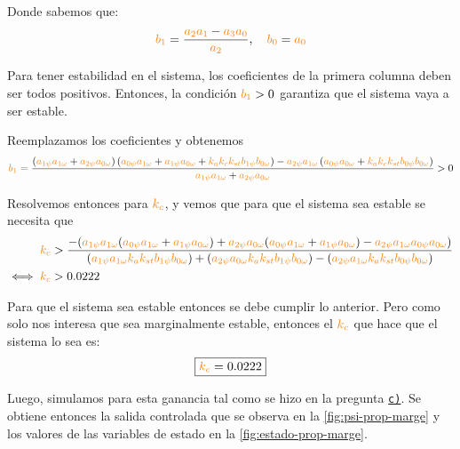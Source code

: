 Donde sabemos que:
\begin{align}
  \nara{b_1} = \frac{\nara{a_2 a_1} - \nara{a_3 a_0}}{\nara{a_2}},\quad
  \nara{b_0} = \nara{a_0}
\end{align}

Para tener estabilidad en el sistema, los coeficientes de la primera columna
deben ser todos positivos. Entonces, la condición $\nara{b_1} > 0$ garantiza
que el sistema vaya a ser estable.

Reemplazamos los coeficientes y obtenemos
\begin{equation}
    \nara{b_1}=\frac{
        \left(\nara{a_{1\psi} a_{1\omega}} + \nara{a_{2\psi} a_{0\omega}}\right)
        \left(\nara{a_{0\psi} a_{1\omega}} + \nara{a_{1\psi} a_{0\omega}} + \nara{k_a k_c k_{st} b_{1\psi} b_{0\omega}}\right) 
        - \nara{a_{2\psi} a_{1\omega}} 
        \left(\nara{a_{0\psi} a_{0\omega}} + \nara{k_a k_c k_{st} b_{0\psi} b_{0\omega}}\right)
    }{
        \nara{a_{1\psi} a_{1\omega}} + \nara{a_{2\psi} a_{0\omega}}
    } > 0
\end{equation}

Resolvemos entonces para $\nara{k_{c}}$, y vemos que para que el sistema sea
estable se necesita que
\begin{align}
       \nara{k_{c}} &> \dfrac{-(\nara{a_{1\psi} a_{1\omega}}(\nara{a_{0\psi} a_{1\omega}} + \nara{a_{1\psi} a_{0\omega}}) + \nara{ a_{2\psi} a_{0\omega} }(\nara{a_{0\psi} a_{1\omega}} + \nara{a_{1\psi} a_{0\omega}}) - \nara{a_{2\psi} a_{1\omega} a_{0\psi} a_{0\omega}})}  {(\nara{a_{1\psi} a_{1\omega} k_a k_{st} b_{1\psi} b_{0\omega}}) + (\nara{a_{2\psi} a_{0\omega} k_a k_{st} b_{1\psi} b_{0\omega}}) - (\nara{a_{2\psi} a_{1\omega} k_a k_{st} b_{0\psi} b_{0\omega}})} \\
  \iff \nara{k_{c}} &> 0.0222
\end{align}

Para que el sistema sea estable entonces se debe cumplir lo anterior. Pero
como solo nos interesa que sea marginalmente estable, entonces el $\nara{k_{c}}$
que hace que el sistema lo sea es:
\begin{equation}
    \boxed{\nara{k_c} = 0.0222}
\end{equation}

Luego, simulamos para esta ganancia tal como se hizo en la pregunta \hyperref[pregunta-c]{\texttt{c)}}.
Se obtiene entonces la salida controlada que se observa en la \autoref{fig:psi-prop-marge}
y los valores de las variables de estado en la \autoref{fig:estado-prop-marge}.

